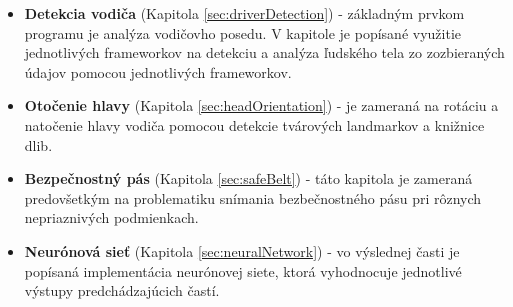 \documentclass[slovak,master,dept460,male,cpp,cpdeclaration]{diploma}
\begin{document}
\begin{itemize}
\item \textbf{Detekcia vodiča} (Kapitola \ref{sec:driverDetection}) - základným prvkom programu je  analýza vodičovho posedu.  V kapitole je popísané využitie jednotlivých frameworkov na detekciu a analýza ľudského tela zo zozbieraných údajov pomocou jednotlivých frameworkov.

\item \textbf{Otočenie hlavy} (Kapitola \ref{sec:headOrientation}) - je zameraná na rotáciu a natočenie hlavy vodiča pomocou detekcie tvárových landmarkov a knižnice dlib\cite{dlib09}. 

\item \textbf{Bezpečnostný pás} (Kapitola \ref{sec:safeBelt}) - táto kapitola je zameraná  predovšetkým na problematiku snímania bezbečnostného pásu pri rôznych nepriaznivých podmienkach.


\item \textbf{Neurónová sieť} (Kapitola \ref{sec:neuralNetwork}) - vo výslednej časti je popísaná implementácia neurónovej siete, ktorá vyhodnocuje jednotlivé výstupy predchádzajúcich častí.

\end{itemize}

\newpage
\end{document}
